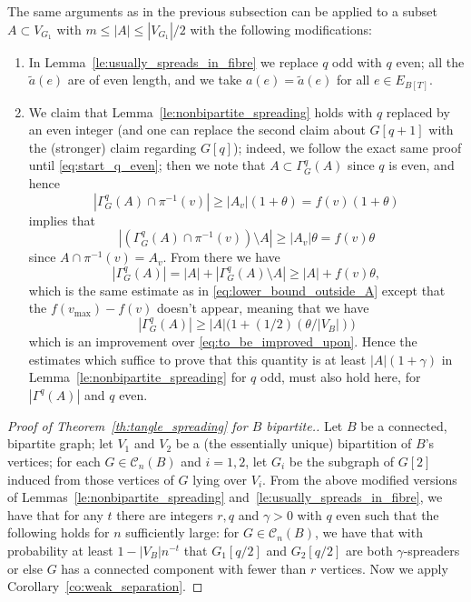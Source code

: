 \documentclass{memo-l}
\theoremstyle{plain}
\theoremstyle{definition}
\numberwithin{section}{chapter}
\numberwithin{equation}{chapter}
\theoremstyle{plain}
\theoremstyle{definition}
\newcommand\cC{\mathcal{C}}
\begin{document}
The same arguments as in the previous subsection can be applied to
a subset $A\subset V_{G_1}$ with 
$m\le |A|\le |V_{G_1}|/2$ with the following modifications:
\begin{enumerate}
\item
In Lemma~\ref{le:usually_spreads_in_fibre} we replace $q$ odd with $q$ even;
all the $\tilde a(e)$ are of even length, and we take
$a(e)=\tilde a(e)$ for all $e\in E_{B[T]}$.
\item
We claim that
Lemma~\ref{le:nonbipartite_spreading} holds with $q$ replaced by
an even integer (and one can replace the second claim about
$G[q+1]$ with the (stronger) claim regarding $G[q]$);
indeed, we follow the exact same proof until
\eqref{eq:start_q_even}; then we note that $A\subset\Gamma^q_G(A)$
since $q$ is even, and hence
$$
|\Gamma^q_G(A)\cap \pi^{-1}(v) | \ge |A_v| (1+\theta) = f(v)(1+\theta)
$$
implies that
$$
|(\Gamma^q_G(A)\cap \pi^{-1}(v))\setminus A | 
\ge |A_v| \theta = f(v)\theta
$$
since $A\cap\pi^{-1}(v)=A_v$.  From there we have
$$
|\Gamma^q_G(A)| =
|A| + 
|\Gamma^q_G(A)\setminus A| 
\ge |A| + f(v)\theta ,
$$
which is the same estimate as in
\eqref{eq:lower_bound_outside_A}
except that the $f(v_{\max})-f(v)$ doesn't appear, meaning that we have
$$
|\Gamma^q_G(A)| \ge 
|A| \bigl(  1 + (1/2)(\theta/|V_B|) \bigr)
$$
which is an improvement over \eqref{eq:to_be_improved_upon}.
Hence the estimates which suffice to prove that this quantity is
at least $|A|(1+\gamma)$ in Lemma~\ref{le:nonbipartite_spreading}
for $q$ odd, must also hold here, for $|\Gamma^q(A)|$ and $q$ even.
\end{enumerate}

\begin{proof}[Proof of Theorem~\ref{th:tangle_spreading} for $B$
bipartite.]
Let $B$ be a connected, bipartite graph; let $V_1$ and $V_2$ be a
(the essentially unique)
bipartition of $B$'s vertices; for each $G\in\cC_n(B)$ and $i=1,2$,
let $G_i$ be the subgraph of $G[2]$ induced from those vertices
of $G$ lying over $V_i$.
From the above modified versions of 
Lemmas~\ref{le:nonbipartite_spreading}
and~\ref{le:usually_spreads_in_fibre}, 
we have that for any $t$ there are integers $r,q$ and $\gamma>0$ with $q$
even such
that the following holds for $n$ sufficiently large: for 
$G\in\cC_n(B)$,
we have that with probability at least
$1-|V_B|n^{-t}$ that $G_1[q/2]$ and $G_2[q/2]$ are both 
$\gamma$-spreaders or else $G$ has a connected component with fewer
than $r$ vertices.  
Now we apply 
Corollary~\ref{co:weak_separation}.
\end{proof}
\end{document}
